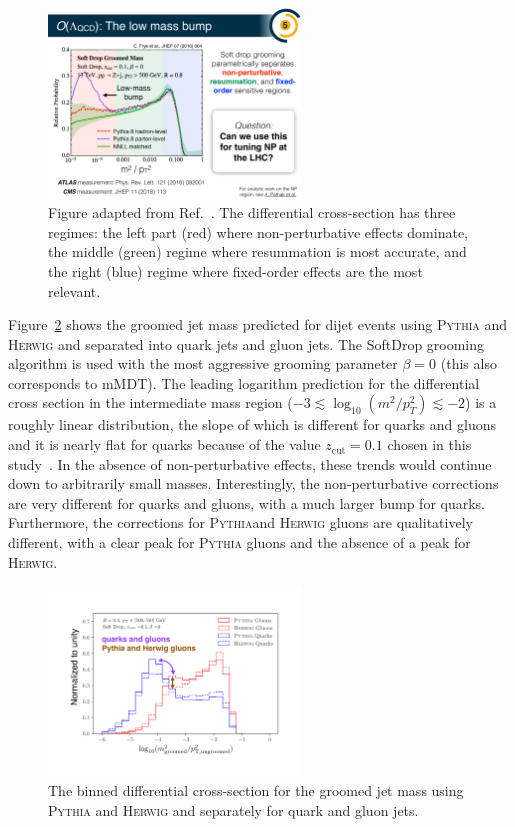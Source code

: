 \documentclass[11pt]{cernrep}
\begin{document}
\begin{figure}[h!]
\centering
\includegraphics[width=0.6\textwidth]{figs/Lowmassbump.pdf}
\caption{Figure adapted from Ref.~\cite{Frye:2016aiz}.  The differential cross-section has three regimes: the left part (red) where non-perturbative effects dominate, the middle (green) regime where resummation is most accurate, and the right (blue) regime where fixed-order effects are the most relevant.}
\label{fig:jets:np:illustration}
\end{figure}

Figure~\ref{fig:jets:np:qg} shows the groomed jet mass predicted for dijet events using \textsc{Pythia} and \textsc{Herwig} and separated into quark jets and gluon jets.  The SoftDrop grooming algorithm is used with the most aggressive grooming parameter $\beta=0$ (this also corresponds to mMDT).  The leading logarithm prediction for the differential cross section in the intermediate mass region ($-3\lesssim\log_{10}(m^2/p_T^2)\lesssim -2$) is a roughly linear distribution, the slope of which is different for quarks and gluons and it is nearly flat for quarks because of the value $z_\text{cut}=0.1$ chosen in this study~\cite{Dasgupta:2013ihk}. In the absence of non-perturbative effects, these trends would continue down to arbitrarily small masses. Interestingly, the non-perturbative corrections are very different for quarks and gluons, with a much larger bump for quarks.  Furthermore, the corrections for \textsc{Pythia}and \textsc{Herwig} gluons are qualitatively different, with a clear peak for \textsc{Pythia} gluons and the absence of a peak for \textsc{Herwig}.

\begin{figure}[h!]
\centering
\includegraphics[width=0.6\textwidth]{figs/NPbumpvariations.pdf}
\caption{The binned differential cross-section for the groomed jet mass using \textsc{Pythia} and \textsc{Herwig} and separately for quark and gluon jets.}
\label{fig:jets:np:qg}
\end{figure}
\end{document}
